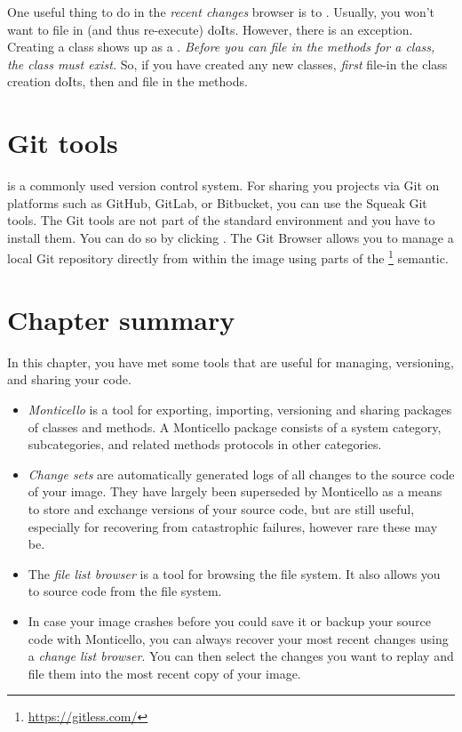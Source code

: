 \documentclass[a4paper,10pt,twoside]{book}
\begin{document}
One useful thing to do in the \emph{recent changes} browser is to .
Usually, you won't want to file in (and thus re-execute) doIts.
However, there is an exception.
Creating a class shows up as a .
\emph{Before you can file in the methods for a class, the class must exist.}
So, if you have created any new classes, \emph{first} file-in the class creation doIts, then  and file in the methods.


\section{Git tools}
 is a commonly used version control system.
For sharing you projects via Git on platforms such as GitHub, GitLab, or Bitbucket, you can use the Squeak Git tools.
The Git tools are not part of the standard environment and you have to install them.
You can do so by clicking .
The Git Browser allows you to manage a local Git repository directly from within the image using parts of the \footnote{\url{https://gitless.com/}} semantic.

\section{Chapter summary}
\label{sec:chapterSummary} %

In this chapter, you have met some tools that are useful for managing, versioning, and sharing your code.

\begin{itemize}
	\item \emph{Monticello} is a tool for exporting, importing, versioning and sharing packages of classes and methods.
	A Monticello package consists of a system category, subcategories, and related methods protocols in other categories.
	\item \emph{Change sets} are automatically generated logs of all changes to the source code of your image.
	They have largely been superseded by Monticello as a means to store and exchange versions of your source code, but are still useful, especially for recovering from catastrophic failures, however rare these may be.
	\item The \emph{file list browser} is a tool for browsing the file system.
	It also allows you to  source code from the file system.
	\item In case your image crashes before you could save it or backup your source code with Monticello, you can always recover your most recent changes using a \emph{change list browser}.
	You can then select the changes you want to replay and file them into the most recent copy of your image.
\end{itemize}
\end{document}
